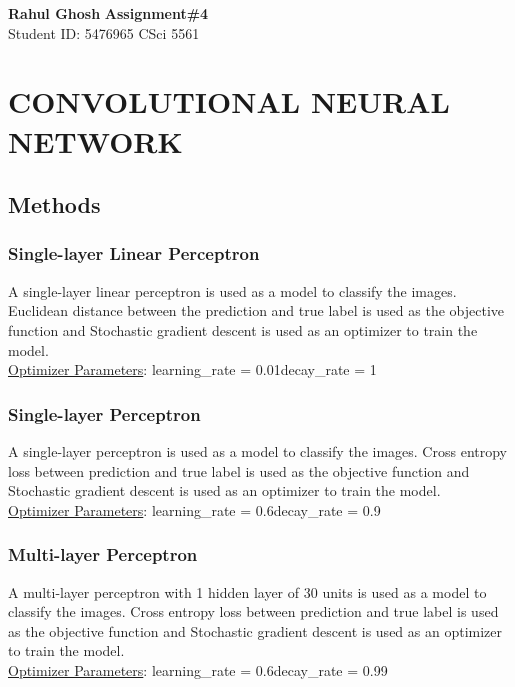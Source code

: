 \documentclass[letter, 10pt]{article}
\begin{document}
\noindent
\large \textbf{Rahul Ghosh} \hfill \textbf{Assignment\#4}\\
\normalsize Student ID: 5476965 \hfill CSci 5561\\

\section*{\centering CONVOLUTIONAL NEURAL NETWORK}

\subsection*{Methods}
\subsubsection*{Single-layer Linear Perceptron}
A single-layer linear perceptron is used as a model to classify the images. Euclidean distance between the prediction and true label is used as the objective function and Stochastic gradient descent is used as an optimizer to train the model.\\
\underline{Optimizer Parameters}: learning\_rate = 0.01\quad decay\_rate = 1\\

\subsubsection*{Single-layer Perceptron}
A single-layer perceptron is used as a model to classify the images. Cross entropy loss between prediction and true label is used as the objective function and Stochastic gradient descent is used as an optimizer to train the model.\\
\underline{Optimizer Parameters}: learning\_rate = 0.6\quad decay\_rate = 0.9\\

\subsubsection*{Multi-layer Perceptron}
A multi-layer perceptron with 1 hidden layer of 30 units is used as a model to classify the images. Cross entropy loss between prediction and true label is used as the objective function and Stochastic gradient descent is used as an optimizer to train the model.\\
\underline{Optimizer Parameters}: learning\_rate = 0.6\quad decay\_rate = 0.99\\
\end{document}

